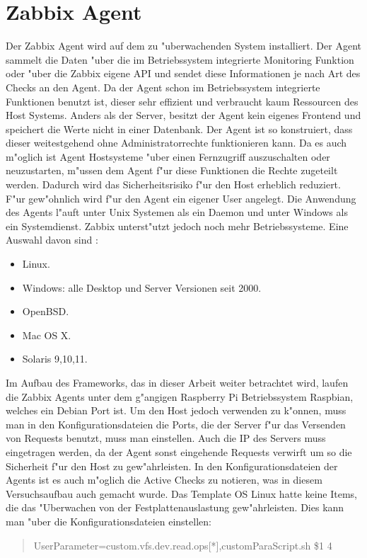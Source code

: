 \section{Zabbix Agent}
\label{sec:agent}
Der Zabbix Agent wird auf dem zu "uberwachenden System installiert. Der Agent sammelt die Daten "uber die im Betriebssystem %
integrierte Monitoring Funktion oder "uber die Zabbix eigene API und sendet diese Informationen je nach Art des Checks an den Agent. %
Da der Agent schon im Betriebssystem integrierte Funktionen benutzt ist, dieser sehr effizient und verbraucht kaum %
Ressourcen des Host Systems. Anders als der Server, besitzt der Agent kein eigenes Frontend und speichert die Werte nicht %
in einer Datenbank. Der Agent ist so konstruiert, dass dieser weitestgehend ohne Administratorrechte funktionieren kann. %
Da es auch m"oglich ist Agent Hostsysteme "uber einen Fernzugriff auszuschalten oder neuzustarten, m"ussen dem Agent f"ur diese Funktionen %
die Rechte zugeteilt werden. Dadurch wird das Sicherheitsrisiko %
f"ur den Host erheblich reduziert. F"ur gew"ohnlich wird f"ur den Agent ein eigener User angelegt. Die Anwendung des Agents %
l"auft unter Unix Systemen als ein Daemon und unter Windows als ein Systemdienst. Zabbix unterst"utzt jedoch noch mehr %
Betriebssysteme. Eine Auswahl davon sind \autocite{zabbix:agent}: 
\begin{itemize}
\item Linux.
\item Windows: alle Desktop und Server Versionen seit 2000.
\item OpenBSD.
\item Mac OS X.
\item Solaris 9,10,11.
\end{itemize}

Im Aufbau des Frameworks, das in dieser Arbeit weiter betrachtet wird, laufen die Zabbix Agents unter dem g"angigen Raspberry Pi %
Betriebssystem Raspbian, welches ein Debian Port ist. Um den Host jedoch verwenden zu k"onnen, muss man in %
den Konfigurationsdateien die Ports, die der Server f"ur das Versenden von Requests benutzt, muss man einstellen. Auch die IP des Servers %
muss eingetragen werden, da der Agent sonst eingehende Requests verwirft um so die Sicherheit f"ur den Host zu gew"ahrleisten. %
In den Konfigurationsdateien der Agents ist es auch m"oglich %
die Active Checks zu notieren, was in diesem Versuchsaufbau auch gemacht wurde. Das Template OS Linux hatte keine Items, die das %
"Uberwachen von der Festplattenauslastung gew"ahrleisten. Dies kann man "uber die Konfigurationsdateien einstellen: %
\begin{quote}

UserParameter=custom.vfs.dev.read.ops[*],customParaScript.sh \$1 4 

\end{quote}

